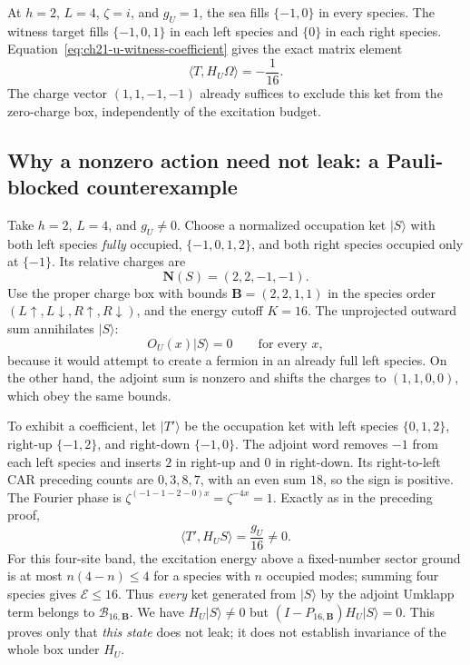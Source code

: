 \begin{example}
\label{ex:ch21-u-four-site}
At \(h=2\), \(L=4\), \(\zeta=i\), and \(g_U=1\),
the sea fills \(\{-1,0\}\) in every species.  The witness target
fills \(\{-1,0,1\}\) in each left species and \(\{0\}\) in
each right species.  Equation~\eqref{eq:ch21-u-witness-coefficient}
gives the exact matrix element
\[
 \langle T,H_U\Omega\rangle=-\frac1{16}.
\]
The charge vector \((1,1,-1,-1)\) already suffices to exclude this
ket from the zero-charge box, independently of the excitation budget.
\end{example}

\subsection*{Why a nonzero action need not leak: a Pauli-blocked counterexample}

\begin{example}
\label{ex:ch21-u-inward-only}
Take \(h=2\), \(L=4\), and \(g_U\ne0\).  Choose a normalized occupation
ket \(|S\rangle\) with both left species \emph{fully} occupied,
\(\{-1,0,1,2\}\), and both right species occupied only at \(\{-1\}\).
Its relative charges are
\[
  \mathbf N(S)=(2,2,-1,-1).
\]
Use the proper charge box with bounds
\(\mathbf B=(2,2,1,1)\) in the species order
\((L\uparrow,L\downarrow,R\uparrow,R\downarrow)\), and the energy
cutoff \(K=16\).  The unprojected outward sum annihilates \(|S\rangle\):
\[
 O_U(x)|S\rangle=0\qquad\text{for every }x,
\]
because it would attempt to create a fermion in an already full
left species.  On the other hand, the adjoint sum is nonzero and
shifts the charges to \((1,1,0,0)\), which obey the same bounds.

To exhibit a coefficient, let \(|T'\rangle\) be the occupation ket with
left species \(\{0,1,2\}\), right-up \(\{-1,2\}\), and
right-down \(\{-1,0\}\).  The adjoint word removes \(-1\) from
each left species and inserts \(2\) in right-up and \(0\) in
right-down.  Its right-to-left CAR preceding counts are
\(0,3,8,7\), with an even sum \(18\), so the sign is positive.
The Fourier phase is \(\zeta^{(-1-1-2-0)x}=\zeta^{-4x}=1\).
Exactly as in the preceding proof,
\begin{equation}
 \langle T',H_U S\rangle=\frac{g_U}{16}\ne0.
 \label{eq:ch21-u-inward-coefficient}
\end{equation}
For this four-site band, the excitation energy above a fixed-number
sector ground is at most \(n(4-n)\le4\) for a species with \(n\)
occupied modes; summing four species gives \(\mathcal E\le16\).
Thus \emph{every} ket generated from \(|S\rangle\) by the adjoint
Umklapp term belongs to \(\mathcal B_{16,\mathbf B}\).  We have
\(H_U|S\rangle\ne0\) but \((I-P_{16,\mathbf B})H_U|S\rangle=0\).
This proves only that \emph{this state} does not leak; it does not
establish invariance of the whole box under \(H_U\).
\end{example}

